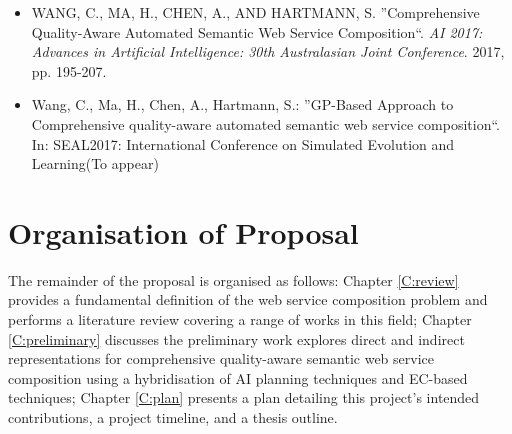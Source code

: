 \begin{itemize}
 \item WANG, C., MA, H., CHEN, A., AND HARTMANN, S. ''Comprehensive Quality-Aware Automated Semantic Web Service Composition``. \textit{AI 2017: Advances in Artificial Intelligence: 30th Australasian Joint Conference}. 2017, pp. 195-207.
 \item Wang, C., Ma, H., Chen, A., Hartmann, S.: ''GP-Based Approach to Comprehensive quality-aware automated semantic web service composition``. In: SEAL2017: International Conference on Simulated Evolution and Learning(To appear)
\end{itemize}


\section{Organisation of Proposal}The remainder of the proposal is organised as follows: Chapter \ref{C:review} provides a fundamental definition of the web service composition problem and performs a literature review covering a range of works in this field; Chapter \ref{C:preliminary} discusses the preliminary work explores direct and indirect representations for comprehensive quality-aware semantic web service composition using a hybridisation of AI planning techniques and EC-based techniques; Chapter \ref{C:plan} presents a plan detailing this project's intended contributions, a project timeline, and a thesis outline.
